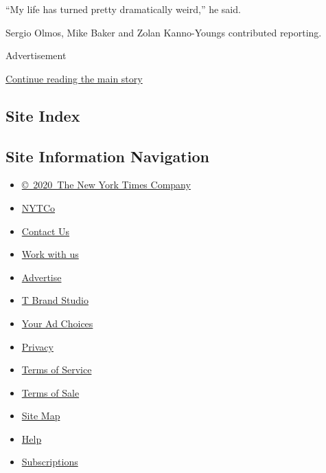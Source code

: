 ``My life has turned pretty dramatically weird,'' he said.

Sergio Olmos, Mike Baker and Zolan Kanno-Youngs contributed reporting.

Advertisement

\protect\hyperlink{after-bottom}{Continue reading the main story}

\hypertarget{site-index}{%
\subsection{Site Index}\label{site-index}}

\hypertarget{site-information-navigation}{%
\subsection{Site Information
Navigation}\label{site-information-navigation}}

\begin{itemize}
\tightlist
\item
  \href{https://help.nytimes3xbfgragh.onion/hc/en-us/articles/115014792127-Copyright-notice}{©~2020~The
  New York Times Company}
\end{itemize}

\begin{itemize}
\tightlist
\item
  \href{https://www.nytco.com/}{NYTCo}
\item
  \href{https://help.nytimes3xbfgragh.onion/hc/en-us/articles/115015385887-Contact-Us}{Contact
  Us}
\item
  \href{https://www.nytco.com/careers/}{Work with us}
\item
  \href{https://nytmediakit.com/}{Advertise}
\item
  \href{http://www.tbrandstudio.com/}{T Brand Studio}
\item
  \href{https://www.nytimes3xbfgragh.onion/privacy/cookie-policy\#how-do-i-manage-trackers}{Your
  Ad Choices}
\item
  \href{https://www.nytimes3xbfgragh.onion/privacy}{Privacy}
\item
  \href{https://help.nytimes3xbfgragh.onion/hc/en-us/articles/115014893428-Terms-of-service}{Terms
  of Service}
\item
  \href{https://help.nytimes3xbfgragh.onion/hc/en-us/articles/115014893968-Terms-of-sale}{Terms
  of Sale}
\item
  \href{https://spiderbites.nytimes3xbfgragh.onion}{Site Map}
\item
  \href{https://help.nytimes3xbfgragh.onion/hc/en-us}{Help}
\item
  \href{https://www.nytimes3xbfgragh.onion/subscription?campaignId=37WXW}{Subscriptions}
\end{itemize}
